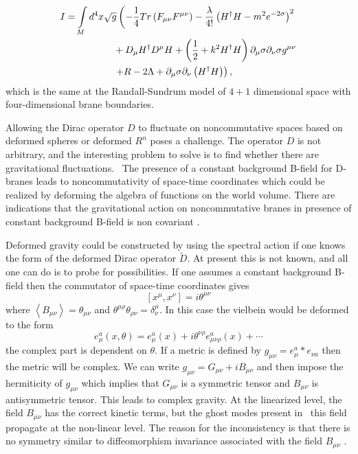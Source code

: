 \documentclass[a4paper,12pt]{article}
\begin{document}
\cite{lizzi}%
\begin{align*}
I &  =\int\limits_{M}d^{4}x\sqrt{g}\left(  -\frac{1}{4}Tr\left(  F_{\mu\nu
}F^{\mu\nu}\right)  -\frac{\lambda}{4!}\left(  H^{\dagger}H-m^{2}e^{-2\sigma
}\right)  ^{2}\right.  \\
&  \hspace{0.7in}+D_{\mu}H^{\dagger}D^{\mu}H+\left(  \frac{1}{2}%
+k^{2}H^{\dagger}H\right)  \partial_{\mu}\sigma\partial_{\nu}\sigma g^{\mu\nu
}\\
&  \hspace{0.7in}\left.  +R-2\Lambda+\partial_{\mu}\sigma\partial_{\nu}\left(
H^{\dagger}H\right)  \right)  ,
\end{align*}
which is the same at the Randall-Sundrum model \cite{RS} of $4+1$ dimensional
space with four-dimensional brane boundaries.

Allowing the Dirac operator $D$ to fluctuate on noncommutative spaces based on
deformed spheres or deformed $R^{n}$ poses a challenge. The operator $D$ is
not arbitrary, and the interesting problem to solve is to find whether there
are gravitational fluctuations. \ The presence of a constant background
B-field for D-branes leads to noncommutativity of space-time coordinates which
could be realized by deforming the algebra of functions on the world volume.
There are indications that the gravitational action on noncommutative branes
in presence of constant background B-field is non covariant \cite{Ardalan}.

Deformed gravity could be constructed by using the spectral action if one
knows the form of the deformed Dirac operator $\widetilde{D}$. At present this
is not known, and all one can do is to probe for possibilities. If one assumes
a constant background B-field then the commutator of space-time coordinates
gives%
\[
\left[  x^{\mu},x^{\nu}\right]  =i\theta^{\mu\nu}%
\]
where $\left\langle B_{\mu\nu}\right\rangle =\theta_{\mu\nu}$ and $\theta
^{\mu\rho}\theta_{\rho\nu}=\delta_{\nu}^{\mu}.$ In this case the vielbein
would be deformed to the form%
\[
e_{\mu}^{a}\left(  x,\theta\right)  =e_{\mu}^{a}\left(  x\right)
+i\theta^{\nu\rho}e_{\mu\nu\rho}^{a}\left(  x\right)  +\cdots
\]
the complex part is dependent on $\theta.$ If a metric is defined by
$g_{\mu\nu}=e_{\mu}^{a}\ast e_{\nu a}$ then the metric will be complex. We can
write $g_{\mu\nu}=G_{\mu\nu}+iB_{\mu\nu}$ and then impose the hermiticity of
$g_{\mu\nu}$ which implies that $G_{\mu\nu}$ is a symmetric tensor and
$B_{\mu\nu}$ is antisymmetric tensor. This leads to complex gravity. At the
linearized level, the field $B_{\mu\nu}$ has the correct kinetic terms, but
the ghost modes present in \ this field propagate at the non-linear level. The
reason for the inconsistency is that there is no symmetry similar to
diffeomorphism invariance associated with the field $B_{\mu\nu}$ \cite{ali1}.
\end{document}

